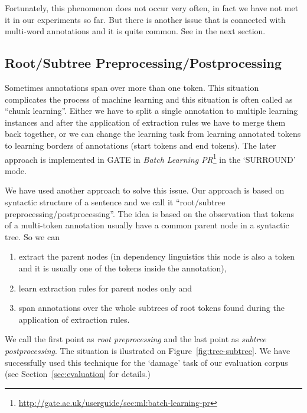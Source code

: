 Fortunately, this phenomenon does not occur very often, in fact we have not met it in our experiments so far. But there is another issue that is connected with multi-word annotations and it is quite common. See in the next section.


\subsection{Root/Subtree Preprocessing/Postprocessing}
Sometimes annotations span over more than one token. This situation complicates the process of machine learning and this situation is often called as ``chunk learning''. Either we have to split a single annotation to multiple learning instances and after the application of extraction rules we have to merge them back together, or we can change the learning task from learning annotated tokens to learning borders of annotations (start tokens and end tokens). The later approach is implemented in GATE in \emph{Batch Learning PR}\footnote{\url{http://gate.ac.uk/userguide/sec:ml:batch-learning-pr}} in the `SURROUND' mode.

We have used another approach to solve this issue. Our approach is based on syntactic structure of a sentence and we call it ``root/subtree preprocessing/postprocessing''. The idea is based on the observation that tokens of a multi-token annotation usually have a common parent node in a syntactic tree. So we can
\begin{enumerate}
	\item extract the parent nodes (in dependency linguistics this node is also a token and it is usually one of the tokens inside the annotation), 
	\item learn extraction rules for parent nodes only and 
	\item span annotations over the whole subtrees of root tokens found during the application of extraction rules.
\end{enumerate}
We call the first point as \emph{root preprocessing} and the last point as \emph{subtree postprocessing}. The situation is ilustrated on Figure~\ref{fig:tree-subtree}. We have successfully used this technique for the `damage' task of our evaluation corpus (see Section~\ref{sec:evaluation} for details.)

